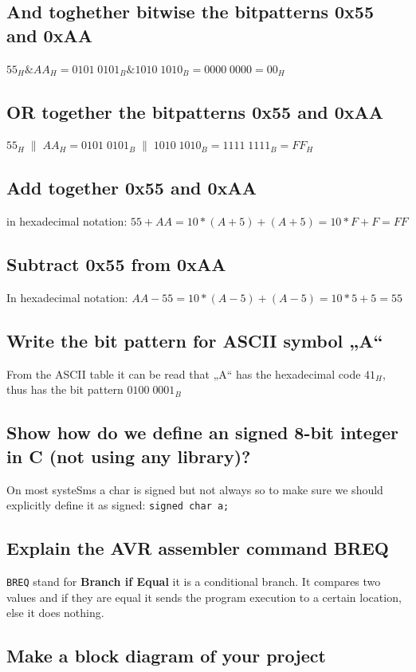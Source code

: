 \documentclass{article}
\begin{document}
\subsection*{ And toghether bitwise the bitpatterns 0x55 and 0xAA}
$55_H \& AA_H = 0101\;0101_B \& 1010\; 1010_B = 0000\;0000 = 00_H$
\subsection*{ OR together the bitpatterns 0x55 and 0xAA}
$55_H\;\|\; AA_H = 0101\;0101_B \;\|\; 1010\; 1010_B = 1111\;1111_B = FF_H$
\subsection*{ Add together 0x55 and 0xAA}
in hexadecimal notation:
$55 + AA = 10*(A+5) + (A+5) = 10*F + F = FF$
\subsection*{ Subtract 0x55 from 0xAA}
In hexadecimal notation:
$AA - 55 = 10*(A-5) + (A-5) = 10*5 + 5 = 55$
\subsection*{ Write the bit pattern for ASCII symbol „A“}
From the ASCII table it can be read that „A“ has the hexadecimal code  $41_H$, thus has the bit pattern $0100\;0001_B$
\subsection*{ Show how do we define an signed 8-bit integer in C (not using any library)?}
On most systeSms a char is signed but not always so to make sure we should explicitly define it as signed:
\verb!signed char a;!
\subsection*{ Explain the AVR assembler command BREQ}
\verb!BREQ! stand for \textbf{Branch if Equal} it is a conditional branch. It compares two values and if they are equal it sends the program execution to a certain location, else it does nothing.

\subsection*{ Make a block diagram of your project}
\end{document}

